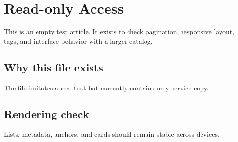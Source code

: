 \section{Read-only Access}

This is an empty test article. It exists to check pagination, responsive layout, tags, and interface behavior with a larger catalog.

\subsection{Why this file exists}

The file imitates a real text but currently contains only service copy.

\subsection{Rendering check}

Lists, metadata, anchors, and cards should remain stable across devices.
